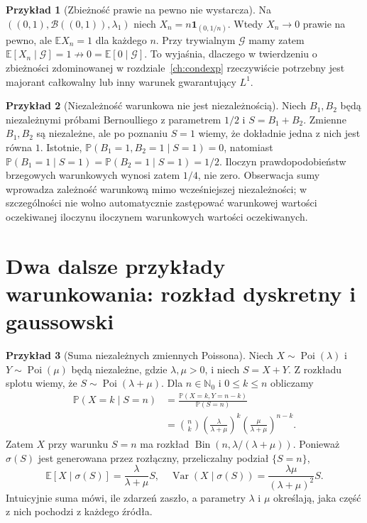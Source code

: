 \documentclass[11pt,a4paper,oneside]{report}
\numberwithin{equation}{chapter}
\theoremstyle{plain}
\theoremstyle{definition}
\newtheorem{przyklad}{Przykład}[chapter]
\theoremstyle{remark}
\newcommand{\N}{\mathbb{N}}
\newcommand{\Prob}{\mathbb{P}}
\newcommand{\E}{\mathbb{E}}
\newcommand{\Var}{\operatorname{Var}}
\newcommand{\ind}[1]{\mathbf{1}_{#1}}
\newcommand{\Bin}{\operatorname{Bin}}
\newcommand{\Poi}{\operatorname{Poi}}
\begin{document}
\begin{przyklad}[Zbieżność prawie na pewno nie wystarcza]
Na $((0,1),\mathcal B((0,1)),\lambda_1)$ niech
$X_n=n\ind{(0,1/n)}$. Wtedy $X_n\to0$ prawie na pewno,
ale $\E X_n=1$ dla każdego $n$.
Przy trywialnym $\mathcal G$ mamy zatem
$\E[X_n\mid\mathcal G]=1\not\to0=\E[0\mid\mathcal G]$.
To wyjaśnia, dlaczego w twierdzeniu o zbieżności zdominowanej
w rozdziale~\ref{ch:condexp} rzeczywiście potrzebny jest majorant
całkowalny lub inny warunek gwarantujący $L^1$.
\end{przyklad}



\begin{przyklad}[Niezależność warunkowa nie jest niezależnością]
Niech $B_1,B_2$ będą niezależnymi próbami Bernoulliego
z parametrem $1/2$ i $S=B_1+B_2$.
Zmienne $B_1,B_2$ są niezależne, ale po poznaniu
$S=1$ wiemy, że dokładnie jedna z nich jest równa $1$.
Istotnie,
$\Prob(B_1=1,B_2=1\mid S=1)=0$, natomiast
$\Prob(B_1=1\mid S=1)=\Prob(B_2=1\mid S=1)=1/2$.
Iloczyn prawdopodobieństw brzegowych warunkowych
wynosi zatem $1/4$, nie zero. Obserwacja sumy
wprowadza zależność warunkową mimo wcześniejszej
niezależności; w szczególności nie wolno automatycznie
zastępować warunkowej wartości oczekiwanej iloczynu
iloczynem warunkowych wartości oczekiwanych.
\end{przyklad}

\section{Dwa dalsze przykłady warunkowania: rozkład dyskretny i gaussowski}

\begin{przyklad}[Suma niezależnych zmiennych Poissona]
Niech $X\sim\Poi(\lambda)$ i $Y\sim\Poi(\mu)$ będą
niezależne, gdzie $\lambda,\mu>0$, i niech $S=X+Y$.
Z rozkładu splotu wiemy, że $S\sim\Poi(\lambda+\mu)$.
Dla $n\in\N_0$ i $0\leq k\leq n$ obliczamy
\begin{align*}
\Prob(X=k\mid S=n)
&=\frac{\Prob(X=k,Y=n-k)}{\Prob(S=n)}\\
&=\binom nk\left(\frac{\lambda}{\lambda+\mu}\right)^k
\left(\frac{\mu}{\lambda+\mu}\right)^{n-k}.
\end{align*}
Zatem $X$ przy warunku $S=n$ ma rozkład
$\Bin(n,\lambda/(\lambda+\mu))$. Ponieważ
$\sigma(S)$ jest generowana przez rozłączny,
przeliczalny podział $\{S=n\}$,
\[
\E[X\mid\sigma(S)]
=\frac{\lambda}{\lambda+\mu}S,
\quad
\Var(X\mid\sigma(S))
=\frac{\lambda\mu}{(\lambda+\mu)^2}S.
\]
Intuicyjnie suma mówi, ile zdarzeń zaszło,
a parametry $\lambda$ i $\mu$ określają,
jaka część z nich pochodzi z każdego źródła.
\end{przyklad}
\end{document}
